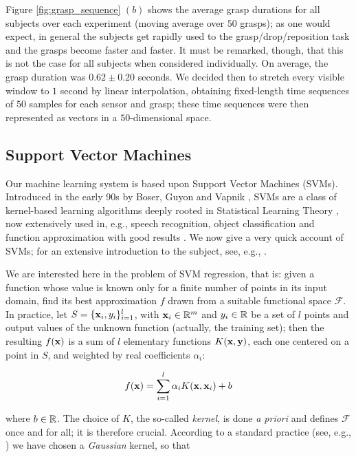 Figure \ref{fig:grasp_sequence} $(b)$ shows the average grasp
durations for all subjects over each experiment (moving average over
$50$ grasps); as one would expect, in general the subjects get rapidly
used to the grasp/drop/reposition task and the grasps become faster
and faster. It must be remarked, though, that this is not the case for
all subjects when considered individually. On average, the grasp
duration was $0.62 \pm 0.20$ seconds. We decided then to stretch every
visible window to $1$ second by linear interpolation, obtaining
fixed-length time sequences of $50$ samples for each sensor and grasp;
these time sequences were then represented as vectors in a
$50$-dimensional space.

\subsection{Support Vector Machines}

Our machine learning system is based upon Support Vector Machines
(SVMs). Introduced in the early 90s by Boser, Guyon and Vapnik
\cite{BGV92}, SVMs are a class of kernel-based learning algorithms
deeply rooted in Statistical Learning Theory \cite{v-edbed-82}, now
extensively used in, e.g., speech recognition, object classification
and function approximation with good results \cite{Cristianini00}. We
now give a very quick account of SVMs; for an extensive introduction
to the subject, see, e.g., \cite{SmolaTut2004}.

We are interested here in the problem of SVM regression, that is:
given a function whose value is known only for a finite number of
points in its input domain, find its best approximation $f$ drawn from
a suitable functional space $\mathcal{F}$. In practice, let
$S=\{\mathbf{x}_i,y_i\}_{i=1}^l$, with $\mathbf{x}_i \in \mathbb{R}^m$ and $y_i \in \mathbb{R}$ be
a set of $l$ points and output values of the unknown function
(actually, the training set); then the resulting $f(\mathbf{x})$ is a sum of
$l$ elementary functions $K(\mathbf{x},\mathbf{y})$, each one centered on a point in
$S$, and weighted by real coefficients $\alpha_i$:

\begin{equation} \label{eqn:sol}
  f(\mathbf{x}) = \sum_{i=1}^l \alpha_i K(\mathbf{x},\mathbf{x}_i) + b
\end{equation}

\noindent where $b \in \mathbb{R}$. The choice of $K$, the so-called
\emph{kernel}, is done \emph{a priori} and defines $\mathcal{F}$
once and for all; it is therefore crucial. According to a standard
practice (see, e.g., \cite{Cristianini00}) we have chosen a
\emph{Gaussian} kernel, so that

